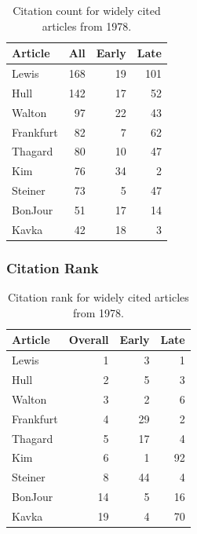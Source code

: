 \documentclass[
  10pt,
  letterpaper,
  DIV=11,
  numbers=noendperiod,
  twoside]{scrartcl}
\begin{document}
\begin{longtable}[]{@{}lrrr@{}}

\caption{\label{tbl-citation-count-1978}Citation count for widely cited
articles from 1978.}

\tabularnewline

\toprule\noalign{}
Article & All & Early & Late \\
\midrule\noalign{}
\endhead
\bottomrule\noalign{}
\endlastfoot
Lewis & 168 & 19 & 101 \\
Hull & 142 & 17 & 52 \\
Walton & 97 & 22 & 43 \\
Frankfurt & 82 & 7 & 62 \\
Thagard & 80 & 10 & 47 \\
Kim & 76 & 34 & 2 \\
Steiner & 73 & 5 & 47 \\
BonJour & 51 & 17 & 14 \\
Kavka & 42 & 18 & 3 \\

\end{longtable}

\subsubsection*{Citation Rank}\label{sec-rank-1978}

\begin{longtable}[]{@{}lrrr@{}}

\caption{\label{tbl-citation-rank-1978}Citation rank for widely cited
articles from 1978.}

\tabularnewline

\toprule\noalign{}
Article & Overall & Early & Late \\
\midrule\noalign{}
\endhead
\bottomrule\noalign{}
\endlastfoot
Lewis & 1 & 3 & 1 \\
Hull & 2 & 5 & 3 \\
Walton & 3 & 2 & 6 \\
Frankfurt & 4 & 29 & 2 \\
Thagard & 5 & 17 & 4 \\
Kim & 6 & 1 & 92 \\
Steiner & 8 & 44 & 4 \\
BonJour & 14 & 5 & 16 \\
Kavka & 19 & 4 & 70 \\

\end{longtable}
\end{document}
